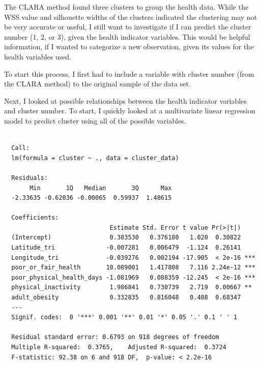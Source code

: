 \documentclass[12pt,twoside]{amherstthesis}
\begin{document}
  The CLARA method found three clusters to group the health data. While
  the WSS value and silhouette widths of the clusters indicated the
  clustering may not be very accurate or useful, I still want to
  investigate if I can predict the cluster number (1, 2, or 3), given the
  health indicator variables. This would be helpful information, if I
  wanted to categorize a new observation, given its values for the health
  variables used.
  
  To start this process, I first had to include a variable with cluster
  number (from the CLARA method) to the original sample of the data set.
  
  \begin{Shaded}
  \begin{Highlighting}[]
  \StringTok{ }\OperatorTok{$}
  \StringTok{ }
  \end{Highlighting}
  \end{Shaded}
  
  Next, I looked at possible relationships between the health indicator
  variables and cluster number. To start, I quickly looked at a
  multivariate linear regression model to predict cluster using all of the
  possible variables.
  
  \begin{Shaded}
  \begin{Highlighting}[]
  \StringTok{ }\OperatorTok{~}
  \end{Highlighting}
  \end{Shaded}
  
  \begin{verbatim}
  
  Call:
  lm(formula = cluster ~ ., data = cluster_data)
  
  Residuals:
       Min       1Q   Median       3Q      Max 
  -2.33635 -0.62036 -0.00065  0.59937  1.48615 
  
  Coefficients:
                             Estimate Std. Error t value Pr(>|t|)    
  (Intercept)                0.383530   0.376180   1.020  0.30822    
  Latitude_tri              -0.007281   0.006479  -1.124  0.26141    
  Longitude_tri             -0.039276   0.002194 -17.905  < 2e-16 ***
  poor_or_fair_health       10.089001   1.417808   7.116 2.24e-12 ***
  poor_physical_health_days -1.081969   0.088359 -12.245  < 2e-16 ***
  physical_inactivity        1.986841   0.730739   2.719  0.00667 ** 
  adult_obesity              0.332835   0.816048   0.408  0.68347    
  ---
  Signif. codes:  0 '***' 0.001 '**' 0.01 '*' 0.05 '.' 0.1 ' ' 1
  
  Residual standard error: 0.6793 on 918 degrees of freedom
  Multiple R-squared:  0.3765,    Adjusted R-squared:  0.3724 
  F-statistic: 92.38 on 6 and 918 DF,  p-value: < 2.2e-16
  \end{verbatim}
  
\end{document}
